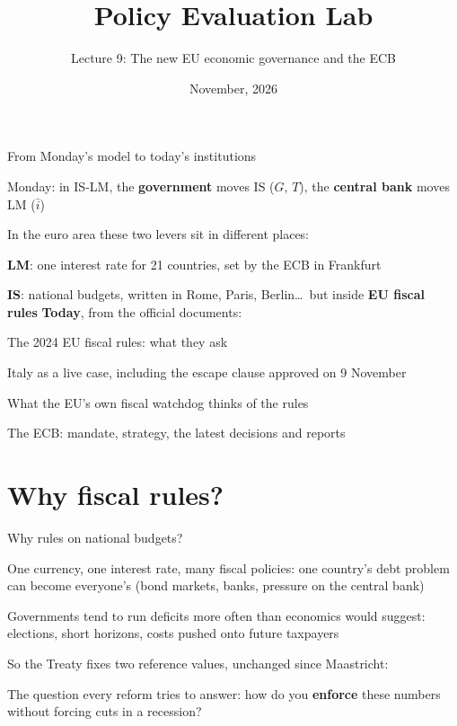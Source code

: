 \documentclass[aspectratio=169,xcolor=table]{beamer}
\title[Policy Evaluation Lab]{Policy Evaluation Lab}
\subtitle[Lecture 9]{Lecture 9: The new EU economic governance and the ECB}
\date[\pelYear]{November, 2026}
\begin{document}
\frame{\titlepage}

\begin{frame}{From Monday's model to today's institutions}
\small
\bi
  \item Monday: in IS-LM, the \textbf{government} moves IS ($G$, $T$), the \textbf{central bank} moves LM ($\bar i$)
  \item In the euro area these two levers sit in different places:
  \bi
    \item \textbf{LM}: one interest rate for 21 countries, set by the ECB in Frankfurt
    \item \textbf{IS}: national budgets, written in Rome, Paris, Berlin\ldots\ but inside \textbf{EU fiscal rules}
  \ei
\ei
\vspace{0.1cm}
\textbf{Today}, from the official documents:
\be
  \item The 2024 EU fiscal rules: what they ask
  \item Italy as a live case, including the escape clause approved on 9 November
  \item What the EU's own fiscal watchdog thinks of the rules
  \item The ECB: mandate, strategy, the latest decisions and reports
\ee
\end{frame}

\section{Why fiscal rules?}

\begin{frame}{Why rules on national budgets?}
\small
\bi
  \item One currency, one interest rate, many fiscal policies: one country's debt problem can become everyone's (bond markets, banks, pressure on the central bank)
  \item Governments tend to run deficits more often than economics would suggest: elections, short horizons, costs pushed onto future taxpayers
  \item So the Treaty fixes two reference values, unchanged since Maastricht:
\ei
\vspace{0.1cm}
\centering
{}
\vspace{0.1cm}

\raggedright
\bi
  \item The question every reform tries to answer: how do you \textbf{enforce} these numbers without forcing cuts in a recession?
\ei
{}
\end{frame}
\end{document}
